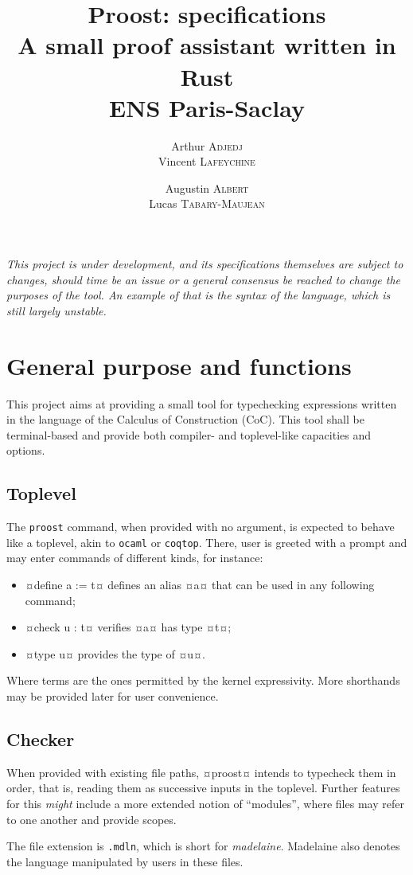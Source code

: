 \documentclass[twocolumn]{article}
\author{
  Arthur \textsc{Adjedj}\\
  Vincent \textsc{Lafeychine} \and
  Augustin \textsc{Albert} \\
  Lucas \textsc{Tabary-Maujean}
}
\title{\textbf{Proost: specifications}\\
  \large A small proof assistant written in Rust
  \\[1\baselineskip]\normalsize ENS Paris-Saclay
}
\begin{document}
\thispagestyle{fancy}
\maketitle

\emph{
  This project is under development, and its specifications themselves are
  subject to changes, should time be an issue or a general consensus be reached
  to change the purposes of the tool. An example of that is the syntax of
  the language, which is still largely unstable.
}

\section{General purpose and functions}
This project aims at providing a small tool for typechecking expressions written in
the language of the Calculus of Construction (CoC). This tool shall be
terminal-based and provide both compiler- and toplevel-like capacities and
options.

\subsection{Toplevel}
The \texttt{proost} command, when provided with no argument, is expected to behave like
a toplevel, akin to \texttt{ocaml} or \texttt{coqtop}. There, user is greeted with a
prompt and may enter commands of different kinds, for instance:
\begin{itemize}
  \item ¤define a := t¤ defines an alias ¤a¤ that can be used in any following
    command;
  \item ¤check u : t¤ verifies ¤a¤ has type ¤t¤;
  \item ¤type u¤ provides the type of ¤u¤.
\end{itemize}

Where terms are the ones permitted by the kernel expressivity.
More shorthands may be provided later for user convenience.

\subsection{Checker}
When provided with existing file paths, ¤proost¤ intends to typecheck them in
order, that is, reading them as successive inputs in the toplevel. Further
features for this \emph{might} include a more extended notion of ``modules'', where files
may refer to one another and provide scopes.

The file extension is \texttt{.mdln}, which is short for \emph{madelaine}.
Madelaine also denotes the language manipulated by users in these files.
\end{document}
